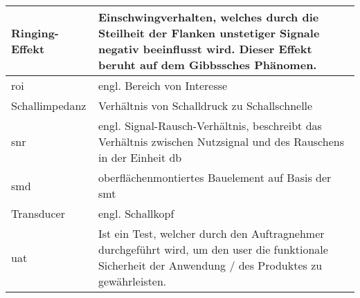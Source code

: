 \begin{longtable}{|p{5.5cm}|p{9.5cm}|}
Ringing-Effekt	& Einschwingverhalten, welches durch die Steilheit der Flanken unstetiger Signale negativ beeinflusst wird. Dieser Effekt beruht auf dem Gibbssches Phänomen.  \\ \hline
\acf{roi} & engl. Bereich von Interesse \\ \hline
Schallimpedanz & Verhältnis von Schalldruck zu Schallschnelle \\ \hline
\acf{snr} & engl. Signal-Rausch-Verhältnis, beschreibt das Verhältnis zwischen Nutzsignal und des Rauschens in der Einheit \ac{db}\\ \hline
\acf{smd} & oberflächenmontiertes Bauelement auf Basis der \acf{smt} \\ \hline
Transducer & engl. Schallkopf \\ \hline
\acf{uat} & Ist ein Test, welcher durch den Auftragnehmer durchgeführt wird, um den user die funktionale Sicherheit der Anwendung / des Produktes zu gewährleisten. \\ \hline
\end{longtable}
